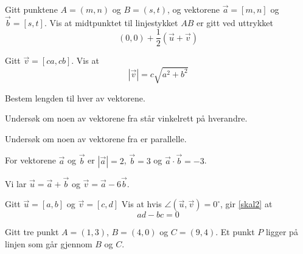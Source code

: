 



	
\opgt
{}
Gitt punktene $ A=(m, n) $ og $ B=(s, t) $, og vektorene $ \vec{a}=[m, n] $ og $ \vec{b}=[s, t] $. Vis at midtpunktet til linjestykket $ AB $ er gitt ved uttrykket
\[ (0, 0) + \frac{1}{2}(\vec{u}+\vec{v}) \]

Gitt $ \vec{v}=[ca, cb] $. Vis at 
\[ |\vec{v}|=c\sqrt{a^2+b^2} \]

 \vs
{}

Bestem lengden til hver av vektorene.

Undersøk om noen av vektorene fra  står vinkelrett på hverandre.

Undersøk om noen av vektorene fra  er parallelle.


For vektorene $ \vec{a} $ og $ \vec{b} $ er $ |\vec{a}|=2 $, $ \vec{b}=3 $ og $ \vec{a}\cdot\vec{b}=-3 $.\os

Vi lar $ \vec{u}=\vec{a}+\vec{b} $ og $ \vec{v}=\vec{a}-6\vec{b} $.

Gitt $ \vec{u}=[a,b] $ og $ \vec{v}=[c, d] $
Vis at hvis $\angle(\vec{u}, \vec{v})=0^\circ $, gir \eqref{skal2} at
\[ ad-bc=0 \]


Gitt tre punkt $ A=(1, 3) $, $ B=(4, 0) $ og $ C=(9, 4) $.
Et punkt $ P $ ligger på linjen som går gjennom $ B $ og $ C $.

